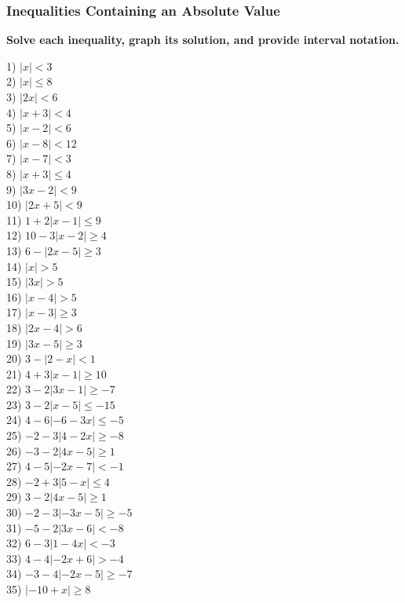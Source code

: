 \documentclass[12pt]{book}
\theoremstyle{definition}
\begin{document}
\subsubsection*{Inequalities Containing an Absolute Value}
{\bf Solve each inequality, graph its solution, and provide interval notation.}
\begin{multicols}{3}
  1) $| x | < 3$\\
  2) $| x | \leq 8$\\
  3) $| 2 x| < 6$\\
  4) $| x + 3| < 4$\\
  5) $| x - 2| < 6$\\
  6) $|x - 8| < 12$\\
  7) $|x - 7| < 3$\\
  8) $|x + 3| \leq 4$\\
  9) $|3x - 2| < 9$\\
  10) $|2x + 5| < 9$\\
  11) $1 + 2 |x - 1| \leq 9$\\
  12) $10 - 3 |x - 2| \geq 4$\\
  13) $6 - |2x - 5| \geq 3$\\
  14) $|x| > 5$\\
  15) $|3x| > 5$\\
  16) $| x - 4| > 5$\\
  17) $| x - 3| \geq 3$\\
  18) $| 2 x - 4| > 6$\\
  19) $| 3 x - 5| \geq 3$\\
  20) $3 - |2 - x| < 1$\\
  21) $4 + 3 |x - 1| \geq 10$\\
  22) $3 - 2 |3x - 1| \geq - 7$\\
  23) $3 - 2 |x - 5| \leq - 15$\\
  24) $4 - 6| - 6 - 3 x| \leq - 5$\\
  25) $- 2 - 3 |4 - 2 x| \geq - 8$\\
  26) $- 3 - 2 |4x - 5| \geq 1$\\
  27) $4 - 5| - 2 x - 7| < - 1$\\
  28) $- 2 + 3 |5 - x| \leq 4$\\
  29) $3 - 2 |4x - 5| \geq 1$\\
  30) $- 2 - 3| - 3 x - 5| \geq - 5$\\
  31) $- 5 - 2 |3x - 6| < - 8$\\
  32) $6 - 3 |1 - 4 x| < - 3$\\
  33) $4 - 4| - 2 x + 6| > - 4$\\
  34) $- 3 - 4| - 2 x - 5| \geq - 7$\\
  35) $| - 10 + x | \geq 8$
\end{multicols}
\end{document}
